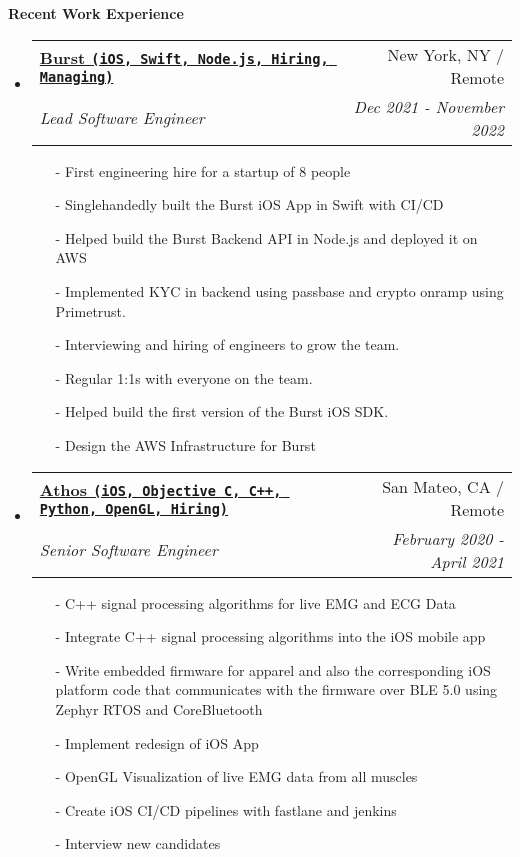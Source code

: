\documentclass[letterpaper,11pt]{article}
\makeatletter
\newcommand{\resheading}[1]{{\large \colorbox{mygrey}{\begin{minipage}{\textwidth}{\textbf{#1 \vphantom{p\^{E}}}}\end{minipage}}}}
\newcommand{\ressubheading}[4]{
\begin{tabular*}{7.0in}{l@{\extracolsep{\fill}}r}
    \textbf{#1} & #2 \\
    \textit{#3} & \textit{#4} \\
\end{tabular*}\vspace{-6pt}}
\makeatother
\begin{document}
\resheading{Recent Work Experience}
\begin{itemize}

\item
    \ressubheading{\href{https://www.joinburst.com}{Burst \texttt{(iOS, Swift, Node.js, Hiring, Managing)}}}{New York, NY / Remote}{Lead Software Engineer}{Dec 2021 - November 2022 }
    \begin{itemize}
        \item[-]{First engineering hire for a startup of 8 people}
        \item[-]{Singlehandedly built the Burst iOS App in Swift with CI/CD}
        \item[-]{Helped build the Burst Backend API in Node.js and deployed it on AWS}
        \item[-]{Implemented KYC in backend using passbase and crypto onramp using Primetrust.}
        \item[-]{Interviewing and hiring of engineers to grow the team.}
        \item[-]{Regular 1:1s with everyone on the team.}
        \item[-]{Helped build the first version of the Burst iOS SDK.}
        \item[-]{Design the AWS Infrastructure for Burst}
    \end{itemize}

\item
    \ressubheading{\href{https://www.crunchbase.com/organization/athos}{Athos \texttt{(iOS, Objective C, C++, Python, OpenGL, Hiring)}}}{San Mateo, CA / Remote}{Senior Software Engineer}{February 2020 - April 2021}
    \begin{itemize}
        \item[-]{C++ signal processing algorithms for live EMG and ECG Data}
        \item[-]{Integrate C++ signal processing algorithms into the iOS mobile app}
        \item[-]{Write embedded firmware for apparel and also the corresponding iOS platform code that communicates with the firmware over BLE 5.0 using Zephyr RTOS and CoreBluetooth}
        \item[-]{Implement redesign of iOS App}
        \item[-]{OpenGL Visualization of live EMG data from all muscles}
        \item[-]{Create iOS CI/CD pipelines with fastlane and jenkins}
        \item[-]{Interview new candidates}
    \end{itemize}


\end{itemize}
\end{document}
